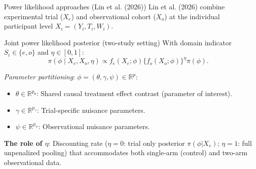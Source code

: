 \documentclass[t]{beamer}
\newcommand{\R}{\mathbb{R}}
\begin{document}
\begin{frame}{Power likelihood approaches (Lin et al. (2026))}
    Lin et al. (2026) combine experimental trial ($X_e$) and observational cohort ($X_o$) at the individual participant level $X_i = (Y_i, T_i, W_i)$.

    \begin{block}{Joint power likelihood posterior (two-study setting)}
    With domain indicator $S_i \in \{e, o\}$ and $\eta \in [0, 1]$:
    \begin{equation*}
        \pi(\phi \mid X_e, X_o, \eta) \propto f_e(X_e; \phi) \{ f_o(X_o; \phi) \}^\eta \pi(\phi).
    \end{equation*}
    \end{block}

    \textit{Parameter partitioning}: \small $\phi = (\theta, \gamma, \psi) \in \R^p$:
    \begin{itemize}
        \item $\theta \in \R^{p_\theta}$: Shared causal treatment effect contrast (parameter of interest).
        \item $\gamma \in \R^{p_\gamma}$: Trial-specific nuisance parameters.
        \item $\psi \in \R^{p_\psi}$: Observational nuisance parameters.
    \end{itemize}

    \textbf{The role of $\eta$}: Discounting rate ($\eta = 0$: trial only posterior $\pi(\phi | X_e)$; $\eta = 1$: full unpenalized pooling) that accommodates both single-arm (control) and two-arm observational data.
\end{frame}
\end{document}
